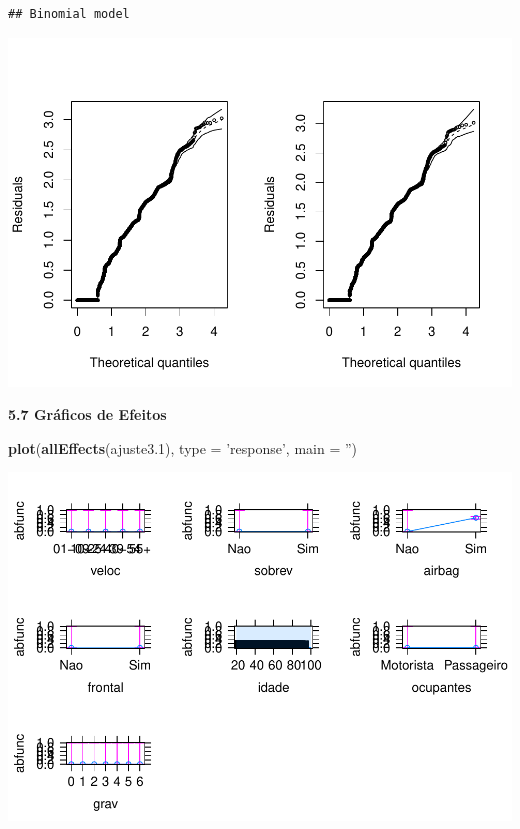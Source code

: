 \documentclass[]{article}
\newenvironment{Shaded}{\begin{snugshade}}{\end{snugshade}}
\newcommand{\KeywordTok}[1]{\textcolor[rgb]{0.13,0.29,0.53}{\textbf{#1}}}
\newcommand{\DataTypeTok}[1]{\textcolor[rgb]{0.13,0.29,0.53}{#1}}
\newcommand{\FloatTok}[1]{\textcolor[rgb]{0.00,0.00,0.81}{#1}}
\newcommand{\StringTok}[1]{\textcolor[rgb]{0.31,0.60,0.02}{#1}}
\newcommand{\NormalTok}[1]{#1}
\begin{document}
\begin{verbatim}
## Binomial model
\end{verbatim}

\includegraphics{Dados_Binários1_files/figure-latex/unnamed-chunk-19-1.pdf}

\textbf{5.7 Gráficos de Efeitos}

\begin{Shaded}
\begin{Highlighting}[]
\KeywordTok{plot}\NormalTok{(}\KeywordTok{allEffects}\NormalTok{(ajuste3}\FloatTok{.1}\NormalTok{), }\DataTypeTok{type =} \StringTok{'response'}\NormalTok{, }\DataTypeTok{main =} \StringTok{''}\NormalTok{)}
\end{Highlighting}
\end{Shaded}

\includegraphics{Dados_Binários1_files/figure-latex/unnamed-chunk-20-1.pdf}
\end{document}
